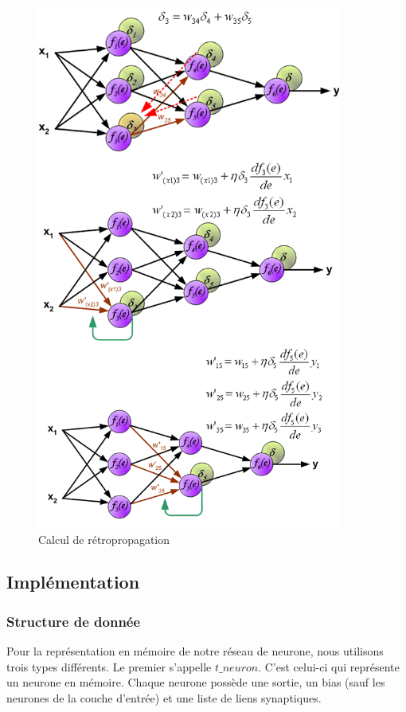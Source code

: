 \documentclass[11pt]{report}
\begin{document}
\begin{figure}[htbp]
\centering
\includegraphics[width=10cm]{retropropagation.png}
\caption{Calcul de rétropropagation}
\label{retropropagation}
\end{figure}

\subsection{Implémentation}

\subsubsection{Structure de donnée}

Pour la représentation en mémoire de notre réseau de neurone, nous utilisons trois types différents. Le premier s'appelle $t\_neuron$. C'est celui-ci qui représente un neurone en mémoire. Chaque neurone possède une sortie, un bias (sauf les neurones de la couche d'entrée) et une liste de liens synaptiques.
\end{document}
